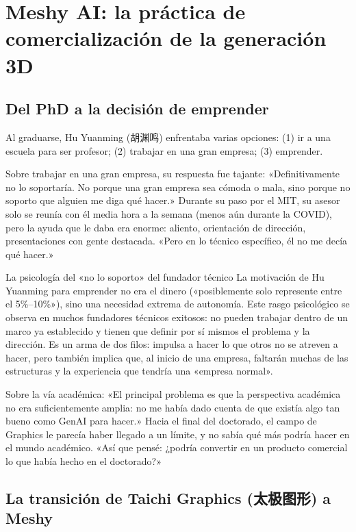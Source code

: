 \documentclass[a4paper]{article}
\begin{document}
\section{Meshy AI: la práctica de comercialización de la generación 3D}

\subsection{Del PhD a la decisión de emprender}

Al graduarse, Hu Yuanming (胡渊鸣) enfrentaba varias opciones: (1) ir a una escuela para ser profesor; (2) trabajar en una gran empresa; (3) emprender.

Sobre trabajar en una gran empresa, su respuesta fue tajante: «Definitivamente no lo soportaría. No porque una gran empresa sea cómoda o mala, sino porque no soporto que alguien me diga qué hacer.» Durante su paso por el MIT, su asesor solo se reunía con él media hora a la semana (menos aún durante la COVID), pero la ayuda que le daba era enorme: aliento, orientación de dirección, presentaciones con gente destacada. «Pero en lo técnico específico, él no me decía qué hacer.»

\begin{knowledgebox}{La psicología del «no lo soporto» del fundador técnico}
La motivación de Hu Yuanming para emprender no era el dinero («posiblemente solo represente entre el 5\%--10\%»), sino una necesidad extrema de autonomía. Este rasgo psicológico se observa en muchos fundadores técnicos exitosos: no pueden trabajar dentro de un marco ya establecido y tienen que definir por sí mismos el problema y la dirección. Es un arma de dos filos: impulsa a hacer lo que otros no se atreven a hacer, pero también implica que, al inicio de una empresa, faltarán muchas de las estructuras y la experiencia que tendría una «empresa normal».
\end{knowledgebox}

Sobre la vía académica: «El principal problema es que la perspectiva académica no era suficientemente amplia: no me había dado cuenta de que existía algo tan bueno como GenAI para hacer.» Hacia el final del doctorado, el campo de Graphics le parecía haber llegado a un límite, y no sabía qué más podría hacer en el mundo académico. «Así que pensé: ¿podría convertir en un producto comercial lo que había hecho en el doctorado?»

\subsection{La transición de Taichi Graphics (太极图形) a Meshy}
\end{document}
